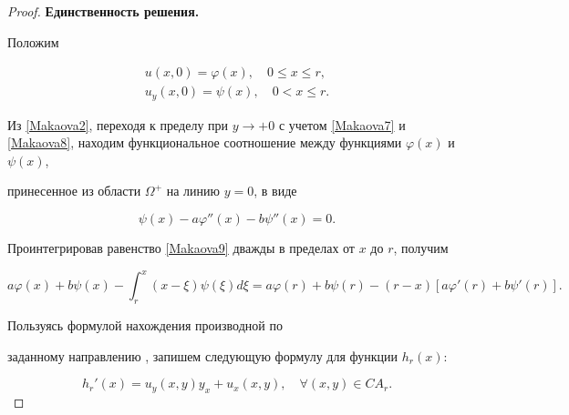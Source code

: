 \begin{proof}

{\bf Единственность решения. }

Положим 

\begin{gather}

\label{Makaova7} 

u(x,0)=\varphi(x),  \quad  0\leq x\leq r,  

\\

\label{Makaova8} 

u_y(x,0)=\psi(x),  \quad   0< x\leq r.

\end{gather}



Из \eqref{Makaova2}, переходя к пределу при $y \to +  0$ с учетом \eqref{Makaova7} и \eqref{Makaova8}, находим функциональное соотношение между функциями $ \varphi(x)$ и $\psi(x)$,

принесенное из области $\Omega^+$ на линию $y=0$, в виде

\begin{equation}

\label{Makaova9} 

\psi(x)-a\varphi''(x)-b\psi''(x)=0.

\end{equation}

Проинтегрировав равенство \eqref{Makaova9} дважды  в пределах от $x$ до $r$, получим

\begin{equation}

\label{Makaova10} 

a\varphi(x)+b\psi(x)-\int _r^x(x-\xi) \psi(\xi) d \xi=

a\varphi(r)+b\psi(r)-(r-x)\left[a\varphi'(r)+b\psi'(r)\right].

\end{equation}



Пользуясь формулой нахождения производной по

заданному направлению \cite[п.~184]{Fikhtengolz_23}, запишем следующую формулу для функции $h_r(x)$:

\begin{equation}

\label{Makaova11}

h_r'(x)=u_y(x,y)y_x +u_x(x,y), \quad  \forall (x,y)\in CA_r.

\end{equation}




\end{proof}
